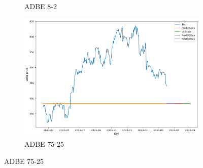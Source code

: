 \documentclass{ieeeojies}
\begin{document}
\begin{figure}[H]
\begin{subfigure}{0.33\linewidth}
        \caption{ADBE 8-2}
        \label{fig:adbe-8-2}
    \end{subfigure}%
    \hfill
    \begin{subfigure}{0.33\linewidth}
        \centering
        \includegraphics[width=\linewidth]{ARIMA Plot/ARIMA_ADBE_75_25.png}
        \caption{ADBE 75-25}
        \label{fig:adbe-75-25}
    \end{subfigure}
\end{figure}
 \vspace{-20pt}
\end{document}
